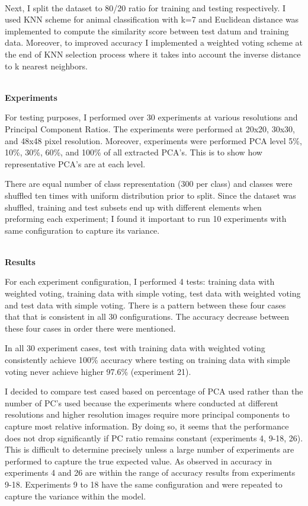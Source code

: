 \documentclass{proposalnsf}
\begin{document}
\ \\

Next, I split the dataset to 80/20 ratio for training and testing respectively.
I used KNN scheme for animal classification with k=7 and Euclidean distance was
implemented to compute the similarity score between test datum and training
data. Moreover, to improved accuracy I implemented a weighted voting scheme
at the end of KNN selection process where it takes into account the inverse
distance to k nearest neighbors.

\ \\


\noindent
{\bf Experiments}

For testing purposes, I performed over 30 experiments at various resolutions and Principal Component Ratios. The experiments were performed at 20x20, 30x30,
and 48x48 pixel resolution. Moreover, experiments were performed PCA level 5\%,
10\%, 30\%, 60\%, and 100\% of all extracted PCA's. This is to show how
representative PCA's are at each level.


There are equal number of class representation (300 per class) and classes
were shuffled ten times with uniform distribution prior to split. Since the dataset was shuffled, training and test subsets end up with different elements
when preforming each experiment; I found it important to run 10 experiments
with same configuration to capture its variance.


\ \\

\noindent
{\bf Results}

For each experiment configuration, I performed 4 tests: training data with
weighted voting, training data with simple voting, test data with weighted
voting and test data with simple voting. There is a pattern between
these four cases that that is consistent in all 30 configurations. The accuracy decrease between these four cases in order there were mentioned.

In all 30 experiment cases, test with training data with weighted voting
consistently achieve 100\% accuracy where testing on training data with simple
voting never achieve higher 97.6\% (experiment 21).

I decided to compare test cased based on percentage of PCA used rather than
the number of PC's used because the experiments where conducted at different
resolutions and higher resolution images require more principal components to
capture most relative information. By doing so, it seems that the performance
does not drop significantly if PC ratio remains constant (experiments 4, 9-18,
26). This is difficult to determine precisely unless a large number of
experiments are performed to capture the true expected value. As observed in
accuracy in experiments 4 and 26 are within the range of accuracy results from
experiments 9-18. Experiments 9 to 18 have the same configuration and were
repeated to capture the variance within the model.
\end{document}

